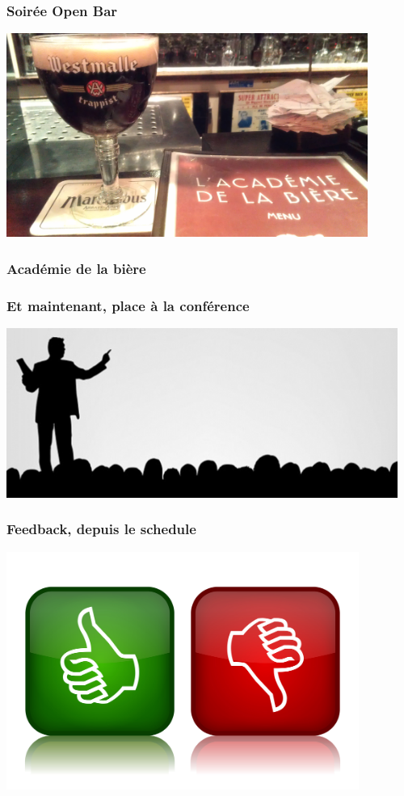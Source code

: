 \documentclass{beamer}
\begin{document}
\begin{frame}[fragile]
  \frametitle{Soirée Open Bar}

  \begin{center}
    \includegraphics[height=18em]{academie-de-la-biere.jpg}
  \end{center}
\end{frame}

\begin{frame}[fragile]
  \frametitle{Académie de la bière}

\end{frame}

\begin{frame}[fragile]
  \frametitle{Et maintenant, place à la conférence}

  \begin{center}
    \includegraphics[height=15em]{speak.jpeg}
  \end{center}
\end{frame}

\begin{frame}[fragile]
  \frametitle{Feedback, depuis le schedule}

  \begin{center}
    \includegraphics[height=21em]{Feedbackimage.jpg}
  \end{center}
\end{frame}
\end{document}
